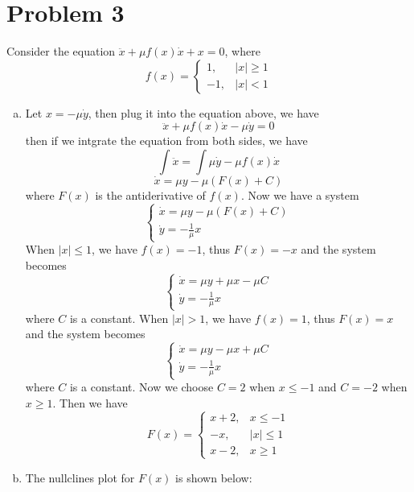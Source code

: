 \documentclass[12pt]{exam}
\begin{document}
\section*{Problem 3}
Consider the equation $\ddot{x} + \mu f(x) \dot{x} + x=0$, where 
\[ f(x) = \begin{cases}
	1, & |x| \geq 1\\
	-1, & |x| < 1
\end{cases} \]

\begin{enumerate}[(a)]
	\item Let $x= -\mu \dot{y}$, then plug it into the equation above, we have
	\[ \ddot{x} + \mu f(x) \dot{x} - \mu \dot{y} = 0 \]
	then if we intgrate the equation from both sides, we have
	\[ \int \ddot{x}  = \int  \mu \dot{y}- \mu f(x) \dot{x} \]
	\[ \dot{x} = \mu y - \mu (F(x) + C) \]
	where $F(x)$ is the antiderivative of $f(x)$. Now we have a system
	\[ \begin{cases}
		\dot{x} = \mu y - \mu (F(x) + C)\\
		\dot{y} = -\frac{1}{\mu}x
	\end{cases} \]
	When $|x| \leq 1$, we have $f(x) = -1$, thus $F(x) = -x$ and the system becomes	
	\[ \begin{cases}
		\dot{x} = \mu y + \mu x - \mu C\\
		\dot{y} = -\frac{1}{\mu}x
	\end{cases} \]
	where $C$ is a constant. When $|x| > 1$, we have $f(x) = 1$, thus $F(x) = x$ and the system becomes
	\[ \begin{cases}
		\dot{x} = \mu y - \mu x + \mu C\\
		\dot{y} = -\frac{1}{\mu}x
	\end{cases} \]
	where $C$ is a constant.
	Now we choose $C = 2$ when $x \leq -1$ and $C = -2$ when $x \geq 1$. Then we have
	\[ F(x) = \begin{cases}
		x+2, & x \leq -1\\
		-x, & |x|\leq 1\\
		x-2, & x \geq 1
	\end{cases} \]


	\item The nullclines plot for $F(x)$ is shown below:

\end{enumerate}
\end{document}
